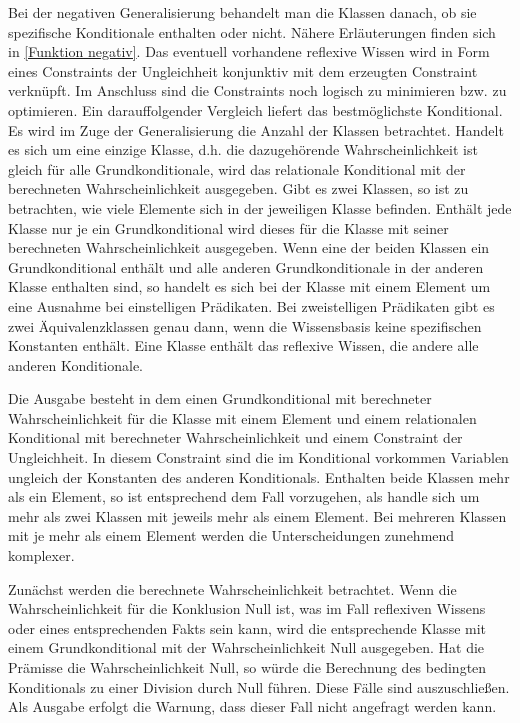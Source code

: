 \documentclass[a4paper, 11pt]{book}
\begin{document}
{Bei der negativen Generalisierung behandelt man die Klassen danach, ob sie spezifische Konditionale enthalten oder nicht. Nähere Erläuterungen finden sich in \ref{Funktion negativ}.
Das eventuell vorhandene reflexive Wissen wird in Form eines Constraints der Ungleichheit konjunktiv mit dem erzeugten Constraint verknüpft.
Im Anschluss sind die Constraints noch logisch zu minimieren bzw. zu optimieren.
Ein darauffolgender Vergleich liefert das bestmöglichste Konditional.
Es wird im Zuge der Generalisierung die Anzahl der Klassen betrachtet. Handelt es sich um eine einzige Klasse, d.h. die dazugehörende Wahrscheinlichkeit ist gleich für alle Grundkonditionale, wird das relationale Konditional mit der berechneten Wahrscheinlichkeit ausgegeben.
Gibt es zwei Klassen, so ist zu betrachten, wie viele Elemente sich in der jeweiligen Klasse befinden. Enthält jede Klasse nur je ein Grundkonditional wird dieses für die Klasse mit seiner berechneten Wahrscheinlichkeit ausgegeben.
Wenn eine der beiden Klassen ein Grundkonditional enthält und alle anderen Grundkonditionale in der anderen Klasse enthalten sind, so handelt es sich bei der Klasse mit einem Element um eine Ausnahme bei einstelligen Prädikaten. Bei zweistelligen Prädikaten gibt es zwei Äquivalenzklassen genau dann, wenn die Wissensbasis keine spezifischen Konstanten enthält. Eine Klasse enthält das reflexive Wissen, die andere alle anderen Konditionale.

Die Ausgabe besteht in dem einen Grundkonditional mit berechneter Wahrscheinlichkeit für die Klasse mit einem Element und einem relationalen Konditional mit berechneter Wahrscheinlichkeit und einem Constraint der Ungleichheit. In diesem Constraint sind die im Konditional vorkommen Variablen ungleich der Konstanten des anderen Konditionals. 
Enthalten beide Klassen mehr als ein Element, so ist entsprechend dem Fall vorzugehen, als handle sich um mehr als zwei Klassen mit jeweils mehr als einem Element.
Bei mehreren Klassen mit je mehr als einem Element werden die Unterscheidungen zunehmend komplexer.

Zunächst werden die berechnete Wahrscheinlichkeit betrachtet. Wenn die Wahrscheinlichkeit für die Konklusion Null ist, was im Fall reflexiven Wissens oder eines entsprechenden Fakts sein kann, wird die entsprechende Klasse mit einem Grundkonditional mit der Wahrscheinlichkeit Null ausgegeben. Hat die Prämisse die Wahrscheinlichkeit Null, so würde die Berechnung des bedingten Konditionals zu einer Division durch Null führen. Diese Fälle sind auszuschließen. Als Ausgabe erfolgt die Warnung, dass dieser Fall nicht angefragt werden kann.

}
\end{document}
